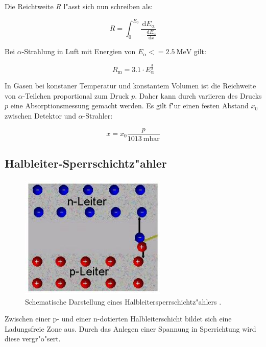 Die Reichtweite $R$ l"asst sich nun schreiben als:

\begin{equation}
	R = \int_0^{E_\mathrm{0}} \frac{\mathrm{d}E_\mathrm{\alpha}}{- \frac{\mathrm{d}E_\mathrm{\alpha}}{\mathrm{d}x}}
\end{equation}

Bei $\alpha$-Strahlung in Luft mit Energien von $E_\mathrm{\alpha} <= \SI{2.5}{\mega\electronvolt}$ gilt:

\begin{equation}
	R_\mathrm{m} = 3.1 \cdot E_\mathrm{\alpha}^\frac{3}{2}
\end{equation}

In Gasen bei konstaner Temperatur und konstantem Volumen ist die Reichweite von $\alpha$-Teilchen proportional zum Druck $p$. Daher kann durch variieren des Drucks $p$ eine Absorptionsmessung gemacht werden. Es gilt f"ur einen festen Abstand $x_\mathrm{0}$ zwischen Detektor und $\alpha$-Strahler:

\begin{equation}
	x = x_\mathrm{0} \frac{p}{\SI{1013}{\milli\bar}}
\end{equation}
\clearpage
\subsection{Halbleiter-Sperrschichtz"ahler} %
\label{sub:halbleiter_sperrschichtz_ahler}


\begin{figure}
	\centering
	\includegraphics[width = 7cm]{img/pn.JPG}
	\caption{Schematische Darstellung eines Halbleitersperrschichtz"ahlers \cite{pn}.}
	\label{fig:pn}
\end{figure}

Zwischen einer p- und einer n-dotierten Halbleiterschicht bildet sich eine Ladungsfreie Zone aus. Durch das Anlegen einer Spannung in Sperrichtung wird diese vergr"o"sert.

